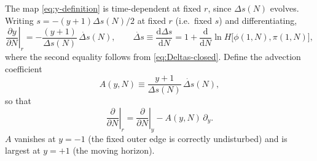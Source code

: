 \documentclass[a4paper,11pt]{article}
\renewcommand{\d}{\mathrm{d}}
\newcommand{\Ny}{N}                          %
\newcommand{\Hub}{H}                         %
\newcommand{\field}{\phi}                    %
\newcommand{\mom}{\pi}                       %
\newcommand{\rad}{r}                         %
\newcommand{\yco}{y}                         %
\newcommand{\Deltas}{\Delta s}                %
\newcommand{\advcoef}{A}                     %
\begin{document}
The map \eqref{eq:y-definition} is time-dependent at fixed $\rad$, since
$\Deltas(\Ny)$ evolves. Writing $s=-(\yco+1)\Deltas(\Ny)/2$ at fixed
$\rad$ (i.e.\ fixed $s$) and differentiating,
\begin{equation}
    \left.\frac{\partial \yco}{\partial \Ny}\right|_\rad
    =
    -\frac{(\yco+1)}{\Deltas(\Ny)}\,\dot{\Deltas}(\Ny) ,
    \qquad
    \dot{\Deltas} \equiv \frac{\d\Deltas}{\d\Ny}
    = 1 + \frac{\d}{\d\Ny}\ln\Hub\big[\field(1,\Ny),\mom(1,\Ny)\big] ,
    \label{eq:Deltas-derivative}
\end{equation}
where the second equality follows from \eqref{eq:Deltas-closed}. Define the
advection coefficient
\begin{equation}
    \advcoef(\yco,\Ny) \equiv \frac{\yco+1}{\Deltas(\Ny)}\,\dot{\Deltas}(\Ny) ,
    \label{eq:advcoef-def}
\end{equation}
so that
\begin{equation}
    \left.\frac{\partial}{\partial \Ny}\right|_\rad
    =
    \left.\frac{\partial}{\partial \Ny}\right|_\yco
    -
    \advcoef(\yco,\Ny)\,\partial_\yco .
    \label{eq:advection-operator}
\end{equation}
$\advcoef$ vanishes at $\yco=-1$ (the fixed outer edge is correctly
undisturbed) and is largest at $\yco=+1$ (the moving horizon).
\end{document}
